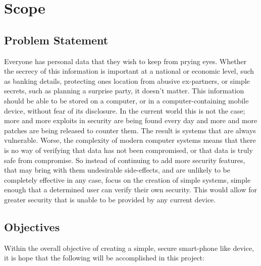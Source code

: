 
\section{Scope}

\label{Ch1 Sec2}


\subsection{Problem Statement}

\label{Ch1 Sec2 Sub1}

Everyone has personal data that they wish to keep from prying eyes. Whether the secrecy of this information is important at a national or economic level, such as banking details, protecting ones location from abusive ex-partners, or simple secrets, such as planning a surprise party, it doesn't matter. This information should be able to be stored on a computer, or in a computer-containing mobile device, without fear of its disclosure. In the current world this is not the case; more and more exploits in security are being found every day and more and more patches are being released to counter them. The result is systems that are always vulnerable. Worse, the complexity of modern computer systems means that there is no way of verifying that data has not been compromised, or that data is truly safe from compromise. So instead of continuing to add more security features, that may bring with them undesirable side-effects, and are unlikely to be completely effective in any case, focus on the creation of simple systems, simple enough that a determined user can verify their own security. This would allow for greater security that is unable to be provided by any current device.


\subsection{Objectives}

\label{Ch1 Sec2 Sub2}

Within the overall objective of creating a simple, secure smart-phone like device, it is hope that the following will be accomplished in this project:

